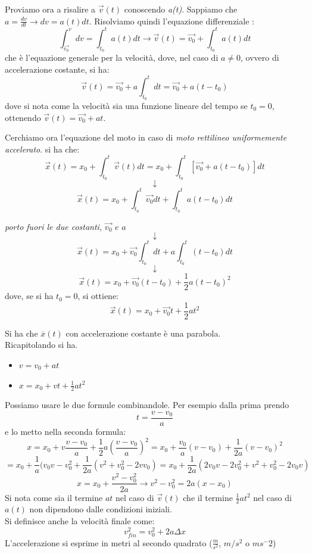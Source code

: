\documentclass[a4paper,12pt, oneside]{book}
\begin{document}
\begin{shaded}
	Proviamo ora a risalire a $\vec{v}(t)$ conoscendo \textit{a(t)}. Sappiamo che $a=\frac{dv}{dt}\rightarrow dv=a(t) dt$. Risolviamo quindi l'equazione differenziale :
	$$\int_{\vec{v_0}}^v dv = \int_{t_0}^t a(t) dt\rightarrow \vec{v}(t)=\vec{v_0}+\int_{t_0}^t a(t) dt$$
	che è l'equazione generale per la velocità, dove, nel caso di $a\neq 0$, ovvero di accelerazione costante, si ha:
	$$\vec{v}(t)=\vec{v_0}+a\int_{t_0}^t dt=\vec{v_0}+a (t-t_0)$$
	dove si nota come la velocità sia una funzione lineare del tempo se $t_0=0$, ottenendo $\vec{v}(t)=\vec{v_0}+a t$.
\end{shaded}
Cerchiamo ora l'equazione del moto in caso di\textit{ moto rettilineo uniformemente accelerato}.
si ha che:
$$\vec{x}(t)=x_0+\int_{t_0}^t \vec{v}(t) dt= x_0+\int_{t_0}^t [\vec{v_0}+a (t-t_0)] dt$$
$$\downarrow$$
$$\vec{x}(t)=x_0+\int_{t_0}^t \vec{v_0} dt +\int_{t_0}^t a (t-t_0) dt$$
\begin{center}
	\textit{porto fuori le due costanti, }$\vec{v_0}\,\, e\,\, a$
	$$\downarrow$$
	$$\vec{x}(t)=x_0+\vec{v_0} \int_{t_0}^t dt +a \int_{t_0}^t (t-t_0) dt$$
	$$\downarrow$$
	$$\vec{x}(t)=x_0+\vec{v_0} (t-t_0)+\frac{1}{2} a  (t-t_0)^2$$
	dove, se si ha $t_0=0$, si ottiene:
	$$\vec{x}(t)=x_0+\vec{v_0} t+\frac{1}{2} a  t^2$$
\end{center}
Si ha che $\overline{x}(t)$ con accelerazione costante è una parabola.\\
Ricapitolando si ha.
\begin{itemize}
	\item $v=v_0+at$
	\item $x=x_0+vt+\frac{1}{2}at^2$
\end{itemize}
Possiamo usare le due formule combinandole. Per esempio dalla prima prendo $$t=\frac{v-v_0}{a}$$ e lo metto nella seconda formula:
$$x=x_0+v\frac{v-v_0}{a}+\frac{1}{2}a \left(\frac{v-v_0}{a}\right)^2=x_0+\frac{v_0}{a}(v-v_0)+\frac{1}{2a}(v-v_0)^2$$
$$=x_0+\frac{1}{a}(v_0v-v_0^2+\frac{1}{2a}(v^2+v_0^2-2vv_0)=x_0+\frac{1}{2a}(2v_0v-2v_0^2+v^2+v_0^2-2v_0v)$$
$$x=x_0+\frac{v^2-v_0^2}{2a}\to v^2-v_0^2=2a(x-x_0)$$
Si nota come sia il termine $a t$ nel caso di $\vec{v}(t)$ che il termine $\frac{1}{2} a  t^2$ nel caso di $a(t)$ non dipendono dalle condizioni iniziali.\\
Si definisce anche la velocità finale come:
$$v_{fin}^2=v_0^2+2a\Delta x$$
L'accelerazione si esprime in metri al secondo quadrato ($\frac{m}{s^2}$, $m/s^2$ o $ms^-2$)
\end{document}
